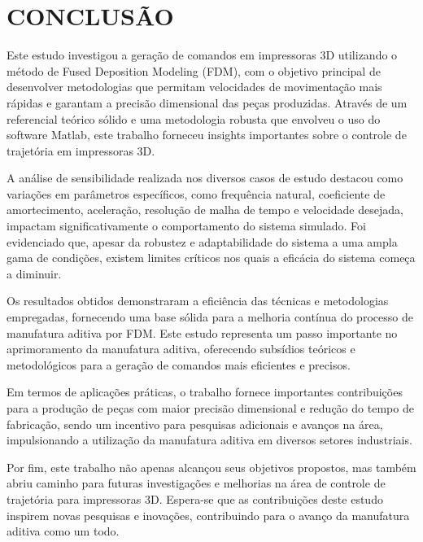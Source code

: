 \chapter{CONCLUSÃO}
Este estudo investigou a geração de comandos em impressoras 3D utilizando o método de Fused Deposition Modeling (FDM), com o objetivo principal de desenvolver metodologias que permitam velocidades de movimentação mais rápidas e garantam a precisão dimensional das peças produzidas. Através de um referencial teórico sólido e uma metodologia robusta que envolveu o uso do software Matlab, este trabalho forneceu insights importantes sobre o controle de trajetória em impressoras 3D.

A análise de sensibilidade realizada nos diversos casos de estudo destacou como variações em parâmetros específicos, como frequência natural, coeficiente de amortecimento, aceleração, resolução de malha de tempo e velocidade desejada, impactam significativamente o comportamento do sistema simulado. Foi evidenciado que, apesar da robustez e adaptabilidade do sistema a uma ampla gama de condições, existem limites críticos nos quais a eficácia do sistema começa a diminuir. 

Os resultados obtidos demonstraram a eficiência das técnicas e metodologias empregadas, fornecendo uma base sólida para a melhoria contínua do processo de manufatura aditiva por FDM. Este estudo representa um passo importante no aprimoramento da manufatura aditiva, oferecendo subsídios teóricos e metodológicos para a geração de comandos mais eficientes e precisos.

Em termos de aplicações práticas, o trabalho fornece importantes contribuições para a produção de peças com maior precisão dimensional e redução do tempo de fabricação, sendo um incentivo para pesquisas adicionais e avanços na área, impulsionando a utilização da manufatura aditiva em diversos setores industriais.

Por fim, este trabalho não apenas alcançou seus objetivos propostos, mas também abriu caminho para futuras investigações e melhorias na área de controle de trajetória para impressoras 3D. Espera-se que as contribuições deste estudo inspirem novas pesquisas e inovações, contribuindo para o avanço da manufatura aditiva como um todo.

